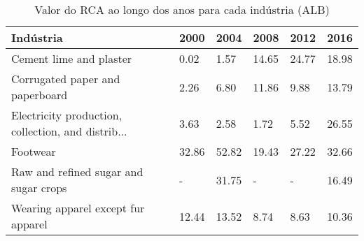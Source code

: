 \begin{table}
\centering
\caption{Valor do RCA ao longo dos anos para cada indústria (ALB)}
\label{tab:ex3-tempo-ALB}
\begin{tabular}{p{6cm}p{1.5cm}p{1.5cm}p{1.5cm}p{1.5cm}p{1.5cm}}
\toprule
                                         Indústria &  2000 &  2004 &  2008 &  2012 &  2016 \\
\midrule
                           Cement lime and plaster &  0.02 &  1.57 & 14.65 & 24.77 & 18.98 \\
                   Corrugated paper and paperboard &  2.26 &  6.80 & 11.86 &  9.88 & 13.79 \\
Electricity production, collection, and distrib... &  3.63 &  2.58 &  1.72 &  5.52 & 26.55 \\
                                          Footwear & 32.86 & 52.82 & 19.43 & 27.22 & 32.66 \\
             Raw and refined sugar and sugar crops &     - & 31.75 &     - &     - & 16.49 \\
                Wearing apparel except fur apparel & 12.44 & 13.52 &  8.74 &  8.63 & 10.36 \\
\bottomrule
\end{tabular}
\end{table}
